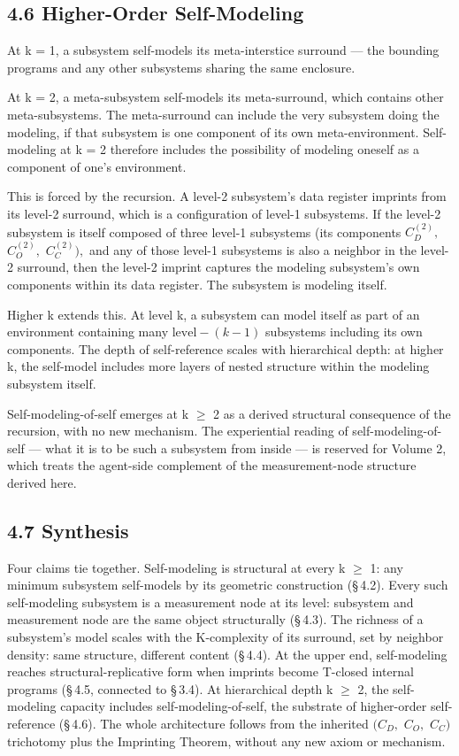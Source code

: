 \documentclass[11pt,oneside]{report}
\theoremstyle{definition}
\theoremstyle{remark}
\begin{document}
\subsection*{4.6 Higher-Order Self-Modeling}

At k = 1, a subsystem self-models its meta-interstice surround --- the
bounding programs and any other subsystems sharing the same enclosure.

At k = 2, a meta-subsystem self-models its meta-surround, which contains
other meta-subsystems. The meta-surround can include the very subsystem
doing the modeling, if that subsystem is one component of its own
meta-environment. Self-modeling at k = 2 therefore includes the
possibility of modeling oneself as a component of one's environment.

This is forced by the recursion. A level-2 subsystem's data register
imprints from its level-2 surround, which is a configuration of level-1
subsystems. If the level-2 subsystem is itself composed of three level-1
subsystems (its components \ensuremath{C_{D}^{(2)},} \ensuremath{C_{O}^{(2)},} \ensuremath{C_{C}^{(2)}),} and
any of those level-1 subsystems is also a neighbor in the level-2
surround, then the level-2 imprint captures the modeling subsystem's own
components within its data register. The subsystem is modeling itself.

Higher k extends this. At level k, a subsystem can model itself as part
of an environment containing many \ensuremath{\text{level}-(k-1)} subsystems including its
own components. The depth of self-reference scales with hierarchical
depth: at higher k, the self-model includes more layers of nested
structure within the modeling subsystem itself.

Self-modeling-of-self emerges at k \ensuremath{\geq} 2 as a derived structural
consequence of the recursion, with no new mechanism. The experiential
reading of self-modeling-of-self --- what it is to be such a subsystem
from inside --- is reserved for Volume 2, which treats the agent-side
complement of the measurement-node structure derived here.

\subsection*{4.7 Synthesis}

Four claims tie together. Self-modeling is structural at every k \ensuremath{\geq} 1:
any minimum subsystem self-models by its geometric construction (\S\,4.2).
Every such self-modeling subsystem is a measurement node at its level:
subsystem and measurement node are the same object structurally (\S\,4.3).
The richness of a subsystem's model scales with the K-complexity of its
surround, set by neighbor density: same structure, different content
(\S\,4.4). At the upper end, self-modeling reaches structural-replicative
form when imprints become T-closed internal programs (\S\,4.5, connected to
\S\,3.4). At hierarchical depth k \ensuremath{\geq} 2, the self-modeling capacity includes
self-modeling-of-self, the substrate of higher-order self-reference
(\S\,4.6). The whole architecture follows from the inherited \ensuremath{(C_{D},} \ensuremath{C_{O},}
\ensuremath{C_{C})} trichotomy plus the Imprinting Theorem, without any new axiom or
mechanism.
\end{document}
